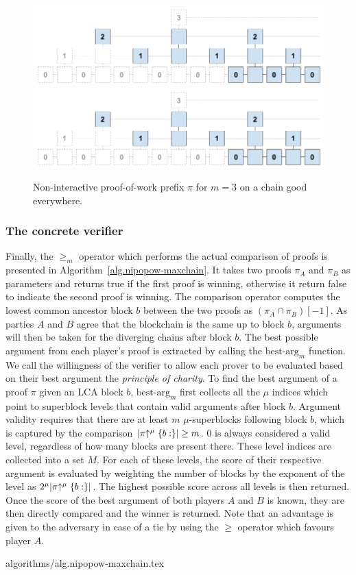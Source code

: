 \begin{figure}[h]
    \caption{
    Non-interactive proof-of-work prefix $\pi$ for $m = 3$ on a chain good
    everywhere.
    }
    \centering
    \iftwocolumn
        \includegraphics[width=\columnwidth,keepaspectratio]{figures/non-interactive-popow.png}
    \else
        \includegraphics[width=0.7\columnwidth,keepaspectratio]{figures/non-interactive-popow.png}
    \fi
    \label{fig.nipopow}
\end{figure}

\subsubsection{The concrete verifier}

Finally, the $\geq_m$ operator which performs the actual comparison of proofs is
presented in Algorithm~\ref{alg.nipopow-maxchain}. It takes two proofs $\pi_A$
and $\pi_B$ as parameters and returns true if the first proof is winning,
otherwise it return false to indicate the second proof is winning. The
comparison operator computes the lowest common ancestor block $b$ between the
two proofs as $(\pi_{A} \cap \pi_B)[-1]$. As parties $A$ and $B$ agree that the
blockchain is the same up to block $b$, arguments will then be taken for the
diverging chains after block $b$. The best possible argument from each player's
proof is extracted by calling the $\text{best-arg}_m$ function. We call the
willingness of the verifier to allow each prover to be evaluated based on their
best argument the \textit{principle of charity}. To find the best argument of a
proof $\pi$ given an LCA block $b$, $\text{best-arg}_m$ first collects all the
$\mu$ indices which point to superblock levels that contain valid arguments
after block $b$. Argument validity requires that there are at least $m$
$\mu$-superblocks following block $b$, which is captured by the comparison
$|\pi\negthickspace\uparrow^\mu\{b:\}| \geq m$. $0$ is always considered a valid level,
regardless of how many blocks are present there. These level indices are
collected into a set $M$. For each of these levels, the score of their
respective argument is evaluated by weighting the number of blocks by the
exponent of the level as $2^\mu|\pi\negthickspace\uparrow^\mu\{b:\}|$. The highest possible
score across all levels is then returned. Once the score of the best argument of
both players $A$ and $B$ is known, they are then directly compared and the
winner is returned. Note that an advantage is given to the adversary in case of
a tie by using the $\geq$ operator which favours player $A$.

{algorithms/alg.nipopow-maxchain.tex}
